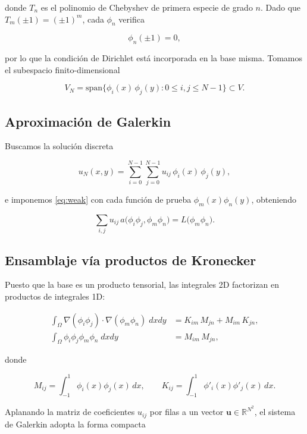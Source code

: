 \documentclass[11pt,a4paper,twoside,pdf]{article}
\numberwithin{equation}{section}
\begin{document}
donde $T_{n}$ es el polinomio de Chebyshev de primera especie de
grado $n$. Dado que $T_{m}(\pm 1) = (\pm 1)^{m}$, cada $\phi_{n}$
verifica

\[
\phi_{n}(\pm 1) = 0,
\]

por lo que la condición de Dirichlet está incorporada en la base
misma.  Tomamos el subespacio finito-dimensional

\[
V_{N} = \mathrm{span}\bigl\{\phi_{i}(x)\,\phi_{j}(y)
: 0 \leq i, j \leq N-1 \bigr\} \subset V.
\]

\subsection{Aproximación de Galerkin}

Buscamos la solución discreta

\begin{equation}
u_{N}(x,y) = \sum_{i=0}^{N-1}\sum_{j=0}^{N-1}
u_{ij}\, \phi_{i}(x)\,\phi_{j}(y),
\end{equation}

e imponemos \eqref{eq:weak} con cada función de prueba
$\phi_{m}(x)\phi_{n}(y)$, obteniendo

\begin{equation}
\sum_{i,j} u_{ij}\,
a\bigl(\phi_{i}\phi_{j}, \phi_{m}\phi_{n}\bigr)
= L\bigl(\phi_{m}\phi_{n}\bigr).
\end{equation}

\subsection{Ensamblaje vía productos de Kronecker}

Puesto que la base es un producto tensorial, las integrales 2D
factorizan en productos de integrales 1D:

\begin{align*}
\int_{\Omega} \nabla(\phi_{i}\phi_{j})\cdot\nabla(\phi_{m}\phi_{n}) \; dxdy
&= K_{im}\, M_{jn} + M_{im}\, K_{jn}, \\
\int_{\Omega} \phi_{i}\phi_{j}\phi_{m}\phi_{n} \; dxdy
&= M_{im}\, M_{jn},
\end{align*}

donde

\begin{equation}
M_{ij} = \int_{-1}^{1} \phi_{i}(x)\phi_{j}(x)\, dx,
\qquad
K_{ij} = \int_{-1}^{1} \phi'_{i}(x)\phi'_{j}(x)\, dx.
\end{equation}

Aplanando la matriz de coeficientes $u_{ij}$ por filas a un vector
$\mathbf{u} \in \mathbb{R}^{N^{2}}$, el sistema de Galerkin adopta la
forma compacta
\end{document}
